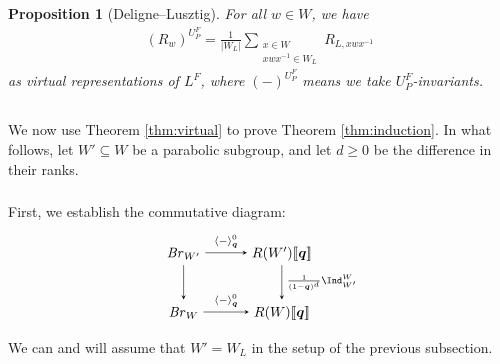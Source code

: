 \documentclass[a4paper,10pt,leqno]{amsart}
\theoremstyle{plain}
\theoremstyle{plain}
\theoremstyle{plain}
\newtheorem{prop}[thm]{Proposition}
\theoremstyle{definition}
\theoremstyle{remark}
\newcommand{\Br}{\mathit{Br}}
\newcommand{\Q}{\bm{q}}
\newcommand{\Tr}[1]{\langle{#1}\rangle_{\Q}}
\begin{document}
\begin{prop}[Deligne--Lusztig]\label{prop:induction-deligne-lusztig}
For all $w \in W$, we have
\begin{align}
(R_w)^{U_P^F} = \frac{1}{|W_L|} \sum_{\substack{x \in W \\ xwx^{-1} \in W_L}} R_{L, xwx^{-1}}
\end{align}
as virtual representations of $L^F$, where $(-)^{U_P^F}$ means we take $U_P^F$-invariants.
\end{prop}

\subsection{}

We now use Theorem \ref{thm:virtual} to prove Theorem \ref{thm:induction}.
In what follows, let $W' \subseteq W$ be a parabolic subgroup, and let $d \geq 0$ be the difference in their ranks.

\subsubsection{}

First, we establish the commutative diagram:
\begin{equation}\label{eq:induction-br}
\begin{tikzpicture}[baseline=(current bounding box.center), >=stealth]
\matrix(m)[matrix of math nodes, row sep=2.5em, column sep=3em, text height=2ex, text depth=0.5ex]
{	\Br_{W'}
		&R(W')[\![\Q]\!]\\
	\Br_W
		&R(W)[\![\Q]\!]\\
		};
\path[->,font=\scriptsize, auto]
(m-1-1)		edge node{$\Tr{-}^0$} (m-1-2)
			edge (m-2-1)
(m-1-2) 	edge node{$\frac{1}{(1 - \Q)^d} \Ind_{W'}^W$} (m-2-2)
(m-2-1) 	edge node{$\Tr{-}^0$} (m-2-2);
\end{tikzpicture}
\end{equation}
We can and will assume that $W' = W_L$ in the setup of the previous subsection.
\end{document}
